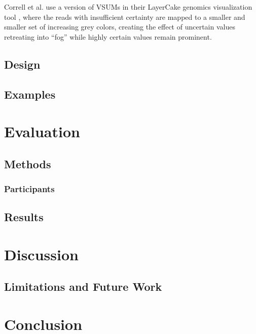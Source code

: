 \documentclass{vgtc}                          %
\begin{document}
Correll et al. use a version of VSUMs in their LayerCake genomics visualization tool \cite{correll2015layercake,correll2011visualizing}, where the reads with insufficient certainty are mapped to a smaller and smaller set of increasing grey colors, creating the effect of uncertain values retreating into ``fog'' while highly certain values remain prominent.

\subsection{Design}


\subsection{Examples}

\section{Evaluation}


\subsection{Methods}


\subsubsection{Participants}
\subsection{Results}

\section{Discussion}
\subsection{Limitations and Future Work}

\section{Conclusion}



%

%
%
%


\end{document}
